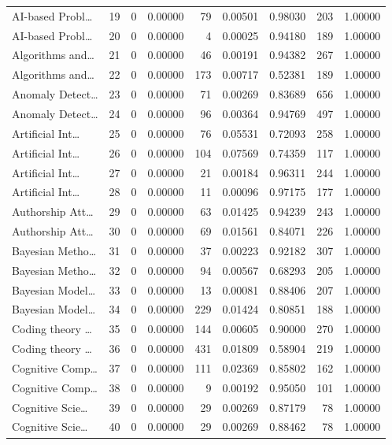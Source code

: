 \begin{table}
\begin{tabular}{lrrrrrrrr}
AI-based Probl… & 19 & 0 & 0.00000 & 79 & 0.00501 & 0.98030 & 203 & 1.00000 \\
AI-based Probl… & 20 & 0 & 0.00000 & 4 & 0.00025 & 0.94180 & 189 & 1.00000 \\
Algorithms and… & 21 & 0 & 0.00000 & 46 & 0.00191 & 0.94382 & 267 & 1.00000 \\
Algorithms and… & 22 & 0 & 0.00000 & 173 & 0.00717 & 0.52381 & 189 & 1.00000 \\
Anomaly Detect… & 23 & 0 & 0.00000 & 71 & 0.00269 & 0.83689 & 656 & 1.00000 \\
Anomaly Detect… & 24 & 0 & 0.00000 & 96 & 0.00364 & 0.94769 & 497 & 1.00000 \\
Artificial Int… & 25 & 0 & 0.00000 & 76 & 0.05531 & 0.72093 & 258 & 1.00000 \\
Artificial Int… & 26 & 0 & 0.00000 & 104 & 0.07569 & 0.74359 & 117 & 1.00000 \\
Artificial Int… & 27 & 0 & 0.00000 & 21 & 0.00184 & 0.96311 & 244 & 1.00000 \\
Artificial Int… & 28 & 0 & 0.00000 & 11 & 0.00096 & 0.97175 & 177 & 1.00000 \\
Authorship Att… & 29 & 0 & 0.00000 & 63 & 0.01425 & 0.94239 & 243 & 1.00000 \\
Authorship Att… & 30 & 0 & 0.00000 & 69 & 0.01561 & 0.84071 & 226 & 1.00000 \\
Bayesian Metho… & 31 & 0 & 0.00000 & 37 & 0.00223 & 0.92182 & 307 & 1.00000 \\
Bayesian Metho… & 32 & 0 & 0.00000 & 94 & 0.00567 & 0.68293 & 205 & 1.00000 \\
Bayesian Model… & 33 & 0 & 0.00000 & 13 & 0.00081 & 0.88406 & 207 & 1.00000 \\
Bayesian Model… & 34 & 0 & 0.00000 & 229 & 0.01424 & 0.80851 & 188 & 1.00000 \\
Coding theory … & 35 & 0 & 0.00000 & 144 & 0.00605 & 0.90000 & 270 & 1.00000 \\
Coding theory … & 36 & 0 & 0.00000 & 431 & 0.01809 & 0.58904 & 219 & 1.00000 \\
Cognitive Comp… & 37 & 0 & 0.00000 & 111 & 0.02369 & 0.85802 & 162 & 1.00000 \\
Cognitive Comp… & 38 & 0 & 0.00000 & 9 & 0.00192 & 0.95050 & 101 & 1.00000 \\
Cognitive Scie… & 39 & 0 & 0.00000 & 29 & 0.00269 & 0.87179 & 78 & 1.00000 \\
Cognitive Scie… & 40 & 0 & 0.00000 & 29 & 0.00269 & 0.88462 & 78 & 1.00000 \\

\end{tabular}
\end{table}
